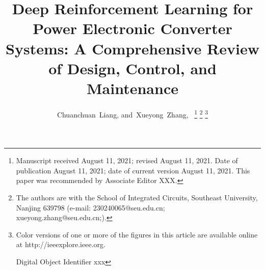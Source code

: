 \title{Deep Reinforcement Learning for Power Electronic Converter Systems: A Comprehensive Review of Design, Control, and Maintenance}


\author{
        Chuanchuan~Liang,
        and~Xueyong~Zhang,~%
\thanks{
Manuscript received August 11, 2021; revised August 11, 2021. Date of publication August 11, 2021; date of current version August 11, 2021. This paper was recommended by Associate Editor XXX. 
}%
\thanks{
The authors are with the School of Integrated Circuits, Southeast University, Nanjing 639798 (e-mail: 230240065@seu.edu.cn; xueyong.zhang@seu.edu.cn;).
}%
\thanks{
Color versions of one or more of the figures in this article are available online at http://ieeexplore.ieee.org. \par
Digital Object Identifier xxx
}
}
